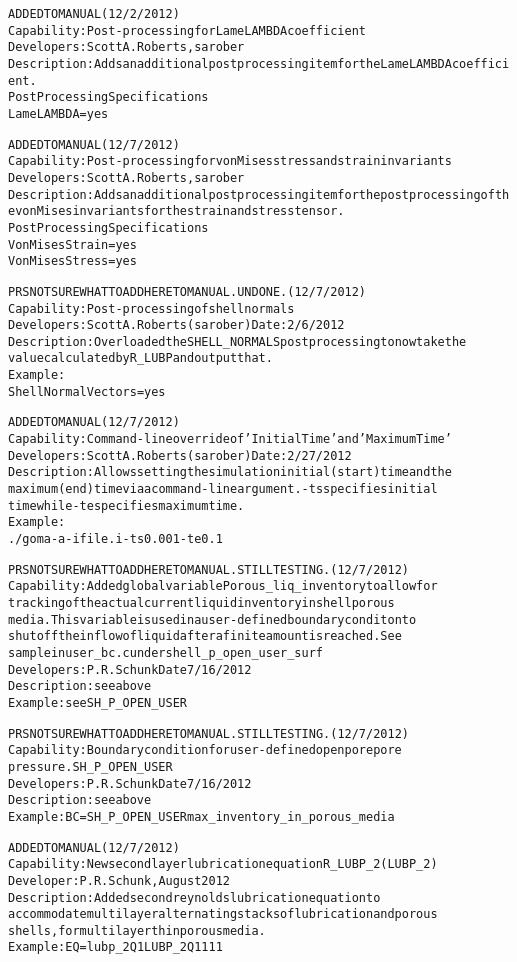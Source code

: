 \documentclass{article}
\begin{document}
\begin{alltt}
ADDED TO MANUAL (12/2/2012)
Capability:  Post-processing for Lame LAMBDA coefficient
Developers:  Scott A. Roberts, sarober
Description:  Adds an additional post processing item for the Lame LAMBDA coefficient.
Post Processing Specifications
Lame LAMBDA = yes

ADDED TO MANUAL (12/7/2012)
Capability:  Post-processing for von Mises stress and strain invariants
Developers:  Scott A. Roberts, sarober
Description:  Adds an additional post processing item for the post processing of the von Mises invariants for the strain and stress tensor.
Post Processing Specifications
Von Mises Strain = yes
Von Mises Stress = yes

PRS NOT SURE WHAT TO ADD HERE TO MANUAL. UNDONE.   (12/7/2012)
Capability:  Post-processing of shell normals
Developers:  Scott A. Roberts (sarober)  Date:  2/6/2012
Description:  Overloaded the SHELL_NORMALS post processing to now take the
  value calculated by R_LUBP and output that.
Example:
  Shell Normal Vectors = yes

ADDED TO MANUAL (12/7/2012)
Capability:  Command-line override of 'Initial Time' and 'Maximum Time'
Developers:  Scott A. Roberts (sarober)  Date:  2/27/2012
Description:  Allows setting the simulation initial (start) time and the
  maximum (end) time via a command-line argument.  -ts specifies initial
  time while -te specifies maximum time.
Example:
  ./goma -a -i file.i -ts 0.001 -te 0.1

PRS NOT SURE WHAT TO ADD HERE TO MANUAL. STILL TESTING.   (12/7/2012)
Capability:   Added global variable Porous_liq_inventory to allow for
tracking of the actual current liquid inventory in shell porous
media.  This variable is used in a user-defined boundary conditon to
shut off the inflow of liquid after a finite amount is reached.   See
sample in user_bc.c under shell_p_open_user_surf
Developers: P. R. Schunk Date 7/16/2012
Description: see above
Example: see SH_P_OPEN_USER

PRS NOT SURE WHAT TO ADD HERE TO MANUAL. STILL TESTING.   (12/7/2012)
Capability: Boundary condition for user-defined open pore pore
pressure.   SH_P_OPEN_USER
Developers: P. R. Schunk Date 7/16/2012
Description: see above
Example: BC = SH_P_OPEN_USER {max_inventory_in_porous_media}

ADDED TO MANUAL (12/7/2012)
Capability:  New second layer lubrication equation R_LUBP_2 (LUBP_2)
Developer: P. R. Schunk, August 2012
Description:  Added second reynolds lubrication equation to
accommodate multilayer alternating stacks of lubrication and porous
shells, for multilayer thin porous media.  
Example: EQ = lubp_2             Q1 LUBP_2        Q1         1   1   1


\end{alltt}
\end{document}
